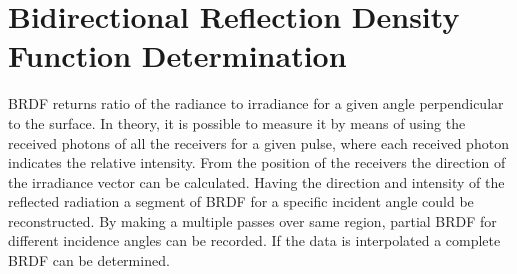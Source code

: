 \section{Bidirectional Reflection Density Function Determination}
\label{BRDFDet}
\acs{BRDF} returns ratio of the radiance to irradiance for a given angle perpendicular to the surface. In theory, it is possible to measure it by means of using the received photons of all the receivers for a given pulse, where each received photon indicates the relative intensity. From the position of the receivers the direction of the irradiance vector can be calculated.  Having the direction and intensity of the reflected radiation a segment of \acs{BRDF} for a specific incident angle could be reconstructed.  By making a multiple passes over same region, partial \acs{BRDF} for different incidence angles can be recorded. If the data is interpolated a complete \acs{BRDF} can be determined. 

